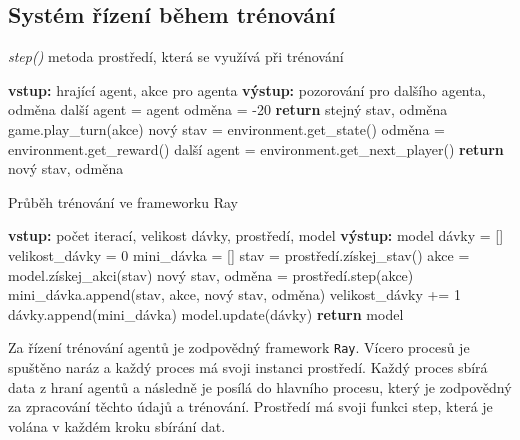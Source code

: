 \subsection{Systém řízení během trénování}

\begin{algorithm}[H]
  \caption{\emph{step()} metoda prostředí, která se využívá při trénování}
  \label{alg:step}
  \begin{algorithmic}
    \State \textbf{vstup:} hrající agent, akce pro agenta
    \State \textbf{výstup:} pozorování pro dalšího agenta, odměna
    \State
    \State další agent = agent
    \State odměna = -20
    \State \textbf{return} stejný stav, odměna
    \EndIf
    \State game.play\_turn(akce)
    \State nový stav = environment.get\_state()
    \State odměna = environment.get\_reward()
    \State další agent = environment.get\_next\_player()
    \State \textbf{return} nový stav, odměna
  \end{algorithmic}
\end{algorithm}

\begin{algorithm}[H]
  \caption{Průběh trénování ve frameworku Ray}
  \label{alg:training}
  \begin{algorithmic}
    \State \textbf{vstup:} počet iterací, velikost dávky, prostředí, model
    \State \textbf{výstup:} model
    \State
    \State dávky = []
        \State velikost\_dávky = 0
        \State mini\_dávka = []
          \State stav = prostředí.získej\_stav()
          \State akce = model.získej\_akci(stav)
          \State nový stav, odměna = prostředí.step(akce)
          \State mini\_dávka.append(stav, akce, nový stav, odměna)
          \State velikost\_dávky += 1
        \EndWhile
        \State dávky.append(mini\_dávka)
      \EndFor 
      \State model.update(dávky)
    \EndFor
    \State \textbf{return} model
  \end{algorithmic}
\end{algorithm}


Za řízení trénování agentů je zodpovědný framework \texttt{Ray}.
Vícero procesů je spuštěno naráz a každý proces má svoji instanci prostředí.
Každý proces sbírá data z hraní agentů a následně je posílá do hlavního procesu, který je zodpovědný za zpracování těchto údajů a trénování.
Prostředí má svoji funkci step, která je volána v každém kroku sbírání dat.

